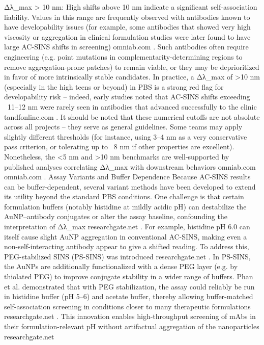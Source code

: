 Δλ_max > 10 nm: High shifts above 10 nm indicate a significant self-association liability. Values in this range are frequently observed with antibodies known to have developability issues (for example, some antibodies that showed very high viscosity or aggregation in clinical formulation studies were later found to have large AC-SINS shifts in screening)
omniab.com
. Such antibodies often require engineering (e.g. point mutations in complementarity-determining regions to remove aggregation-prone patches) to remain viable, or they may be deprioritized in favor of more intrinsically stable candidates. In practice, a Δλ_max of >10 nm (especially in the high teens or beyond) in PBS is a strong red flag for developability risk – indeed, early studies noted that AC-SINS shifts exceeding ~11–12 nm were rarely seen in antibodies that advanced successfully to the clinic
tandfonline.com
.
It should be noted that these numerical cutoffs are not absolute across all projects – they serve as general guidelines. Some teams may apply slightly different thresholds (for instance, using 3–4 nm as a very conservative pass criterion, or tolerating up to ~8 nm if other properties are excellent). Nonetheless, the <5 nm and >10 nm benchmarks are well-supported by published analyses correlating Δλ_max with downstream behaviors
omniab.com
omniab.com
.
Assay Variants and Buffer Dependence
Because AC-SINS results can be buffer-dependent, several variant methods have been developed to extend its utility beyond the standard PBS conditions. One challenge is that certain formulation buffers (notably histidine at mildly acidic pH) can destabilize the AuNP–antibody conjugates or alter the assay baseline, confounding the interpretation of Δλ_max
researchgate.net
. For example, histidine pH 6.0 can itself cause slight AuNP aggregation in conventional AC-SINS, making even a non-self-interacting antibody appear to give a shifted reading. To address this, PEG-stabilized SINS (PS-SINS) was introduced
researchgate.net
. In PS-SINS, the AuNPs are additionally functionalized with a dense PEG layer (e.g. by thiolated PEG) to improve conjugate stability in a wider range of buffers. Phan et al. demonstrated that with PEG stabilization, the assay could reliably be run in histidine buffer (pH 5–6) and acetate buffer, thereby allowing buffer-matched self-association screening in conditions closer to many therapeutic formulations
researchgate.net
. This innovation enables high-throughput screening of mAbs in their formulation-relevant pH without artifactual aggregation of the nanoparticles
researchgate.net
